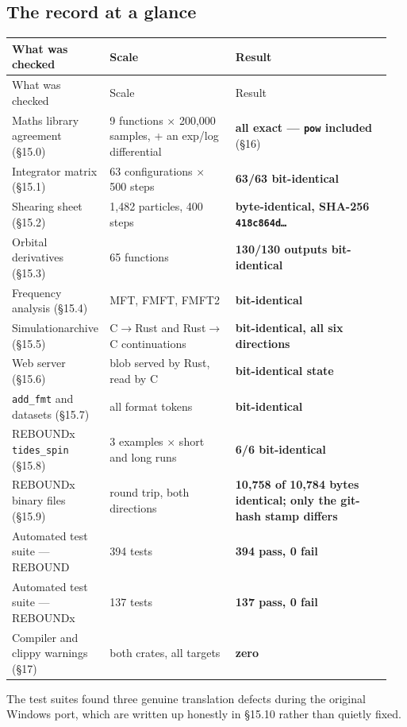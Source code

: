 \documentclass[11pt]{article}
\begin{document}
\subsection{The record at a glance}

\begin{longtable}{L{0.203\linewidth}L{0.335\linewidth}L{0.412\linewidth}}
\toprule
What was checked & Scale & Result \\
\midrule
\endfirsthead
\toprule
What was checked & Scale & Result \\
\midrule
\endhead
Maths library agreement (\S{}15.0) & 9 functions \(\times\) 200,000 samples, + an exp/log differential & \textbf{all exact --- \texttt{pow} included} (\S{}16) \\
Integrator matrix (\S{}15.1) & 63 configurations \(\times\) 500 steps & \textbf{63/63 bit-identical} \\
Shearing sheet (\S{}15.2) & 1,482 particles, 400 steps & \textbf{byte-identical, SHA-256 \texttt{418c864d\ldots{}}} \\
Orbital derivatives (\S{}15.3) & 65 functions & \textbf{130/130 outputs bit-identical} \\
Frequency analysis (\S{}15.4) & MFT, FMFT, FMFT2 & \textbf{bit-identical} \\
Simulationarchive (\S{}15.5) & C\(\rightarrow\)Rust and Rust\(\rightarrow\)C continuations & \textbf{bit-identical, all six directions} \\
Web server (\S{}15.6) & blob served by Rust, read by C & \textbf{bit-identical state} \\
\texttt{add\_fmt} and datasets (\S{}15.7) & all format tokens & \textbf{bit-identical} \\
REBOUNDx \texttt{tides\_spin} (\S{}15.8) & 3 examples \(\times\) short and long runs & \textbf{6/6 bit-identical} \\
REBOUNDx binary files (\S{}15.9) & round trip, both directions & \textbf{10,758 of 10,784 bytes identical; only the git-hash stamp differs} \\
Automated test suite --- REBOUND & 394 tests & \textbf{394 pass, 0 fail} \\
Automated test suite --- REBOUNDx & 137 tests & \textbf{137 pass, 0 fail} \\
Compiler and clippy warnings (\S{}17) & both crates, all targets & \textbf{zero} \\
\bottomrule
\end{longtable}

The test suites found three genuine translation defects during the original Windows port, which are written up honestly in \S{}15.10 rather than quietly fixed.
\end{document}
